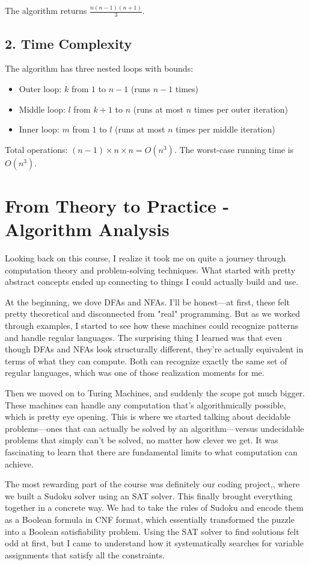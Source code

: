 \documentclass{article}
\theoremstyle{theorem}
\theoremstyle{definition}
\theoremstyle{remark}
\begin{document}
The algorithm returns $\frac{n(n-1)(n+1)}{3}$.

\subsection*{2. Time Complexity}

The algorithm has three nested loops with bounds:
\begin{itemize}
\item Outer loop: $k$ from $1$ to $n-1$ (runs $n-1$ times)
\item Middle loop: $l$ from $k+1$ to $n$ (runs at most $n$ times per outer iteration)
\item Inner loop: $m$ from $1$ to $l$ (runs at most $n$ times per middle iteration)
\end{itemize}

Total operations: $(n-1) \times n \times n = O(n^3)$.
The worst-case running time is $O(n^3)$.

\section{From Theory to Practice - Algorithm Analysis}
Looking back on this course, I realize it took me on quite a journey through computation theory and problem-solving techniques. What started with pretty abstract concepts ended up connecting to things I could actually build and use.

At the beginning, we dove DFAs and NFAs. I'll be honest—at first, these felt pretty theoretical and disconnected from "real" programming. But as we worked through examples, I started to see how these machines could recognize patterns and handle regular languages. The surprising thing I learned was that even though DFAs and NFAs look structurally different, they're actually equivalent in terms of what they can compute. Both can recognize exactly the same set of regular languages, which was one of those realization moments for me.

Then we moved on to Turing Machines, and suddenly the scope got much bigger. These machines can handle any computation that's algorithmically possible, which is pretty eye opening. This is where we started talking about decidable problems—ones that can actually be solved by an algorithm—versus undecidable problems that simply can't be solved, no matter how clever we get. It was fascinating to learn that there are fundamental limits to what computation can achieve.

The most rewarding part of the course was definitely our coding project,, where we built a Sudoku solver using an SAT solver. This finally brought everything together in a concrete way. We had to take the rules of Sudoku and encode them as a Boolean formula in CNF format, which essentially transformed the puzzle into a Boolean satisfiability problem. Using the SAT solver to find solutions felt odd at first, but I came to understand how it systematically searches for variable assignments that satisfy all the constraints.
\end{document}
